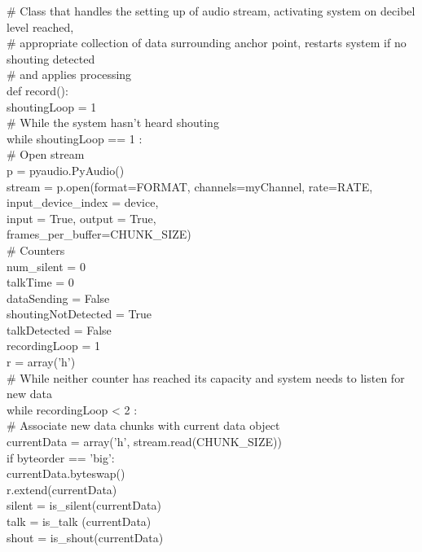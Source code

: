 \documentclass[a4paper,11pt]{report}
\begin{document}
\# Class that handles the setting up of audio stream, activating system on decibel level reached, \\
\# appropriate collection of data surrounding anchor point, restarts system if no shouting detected \\
\# and applies processing\\
def record():       \\
    shoutingLoop = 1\\
    \# While the system hasn't heard shouting\\
    while shoutingLoop == 1 :\\
        \# Open stream\\
        p = pyaudio.PyAudio()\\
        stream = p.open(format=FORMAT, channels=myChannel, rate=RATE, input\_device\_index = device,\\
            input = True, output = True,\\
            frames\_per\_buffer=CHUNK\_SIZE)\\

        \# Counters\\
        num\_silent = 0\\
        talkTime = 0\\
    
        dataSending = False\\
        shoutingNotDetected = True\\
        talkDetected = False\\
        recordingLoop = 1    \\

        r = array('h')\\

        \# While neither counter has reached its capacity and system needs to listen for new data\\
        while recordingLoop < 2 :\\
            \# Associate new data chunks with current data object\\
            currentData = array('h', stream.read(CHUNK\_SIZE))\\

            if byteorder == 'big':\\
                currentData.byteswap()\\
            r.extend(currentData)\\

            silent = is\_silent(currentData)\\
            talk = is\_talk (currentData)\\
            shout = is\_shout(currentData)               \\
        
\end{document}
